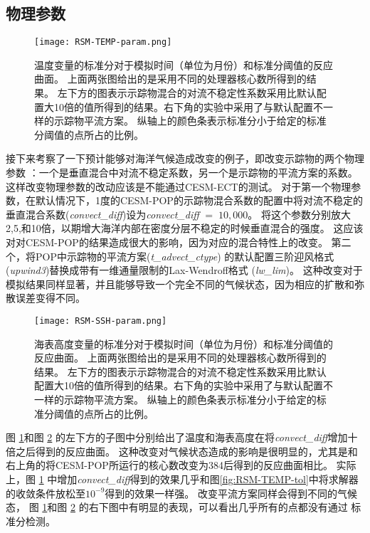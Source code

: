  \subsection{物理参数}\label{verify:pp}

\begin {figure}[!ht]
\centering
\texttt{[image: RSM-TEMP-param.png]}
\caption {
温度变量的标准分对于模拟时间（单位为月份）和标准分阈值的反应曲面。
上面两张图给出的是采用不同的处理器核心数所得到的结果。
左下方的图表示示踪物混合的对流不稳定性系数采用比默认配置大10倍的值所得到的结果。右下角的实验中采用了与默认配置不一样的示踪物平流方案。
纵轴上的颜色条表示标准分小于给定的标准分阈值的点所占的比例。}
\label{fig:RSM-TEMP-param}
\end {figure}
 
接下来考察了一下预计能够对海洋气候造成改变的例子，即改变示踪物的两个物理参数 ：一个是垂直混合中对流不稳定系数，另一个是示踪物的平流方案的系数。
这样改变物理参数的改动应该是不能通过CESM-ECT的测试。
对于第一个物理参数，在默认情况下，1度的CESM-POP的示踪物混合系数的配置中将对流不稳定的垂直混合系数(\textit{convect\_diff})设为\textit{convect\_diff} $=\; 10,000$。
将这个参数分别放大2,5,和10倍，以期增大海洋内部在密度分层不稳定的时候垂直混合的强度。
这应该对对CESM-POP的结果造成很大的影响，因为对应的混合特性上的改变。
第二个，将POP中示踪物的平流方案(\textit{t\_advect\_ctype}) 的默认配置三阶迎风格式(\textit{upwind3})替换成带有一维通量限制的Lax-Wendroff格式 (\textit{lw\_lim})。
这种改变对于模拟结果同样显著，并且能够导致一个完全不同的气候状态，因为相应的扩散和弥散误差变得不同。

\begin{figure} [!ht]
\centering
\texttt{[image: RSM-SSH-param.png]}
\caption {
海表高度变量的标准分对于模拟时间（单位为月份）和标准分阈值的反应曲面。
上面两张图给出的是采用不同的处理器核心数所得到的结果。
左下方的图表示示踪物混合的对流不稳定性系数采用比默认配置大10倍的值所得到的结果。右下角的实验中采用了与默认配置不一样的示踪物平流方案。
纵轴上的颜色条表示标准分小于给定的标准分阈值的点所占的比例。}
\label{fig:RSM-SSH-param}
\end {figure}
 
图 \ref{fig:RSM-TEMP-param}和图 \ref{fig:RSM-SSH-param} 的左下方的子图中分别给出了温度和海表高度在将\textit{convect\_diff}增加十倍之后得到的反应曲面。 这种改变对气候状态造成的影响是很明显的，尤其是和右上角的将CESM-POP所运行的核心数改变为384后得到的反应曲面相比。
实际上，图  \ref{fig:RSM-TEMP-param} 中增加\textit{convect\_diff}得到的效果几乎和图\ref{fig:RSM-TEMP-tol}中将求解器的收敛条件放松至$10^{-9}$得到的效果一样强。
改变平流方案同样会得到不同的气候态， 图 \ref{fig:RSM-TEMP-param}和图 \ref{fig:RSM-SSH-param} 的右下图中有明显的表现，可以看出几乎所有的点都没有通过 标准分检测。 


